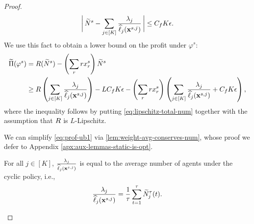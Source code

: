 \documentclass[12pt]{article}
\begin{document}
\begin{proof}
\begin{align}
     \bigg{\lvert}\, \widetilde{N}^s-\sum_{j \in [K]}\frac{\lambda_j}{\widehat{\ell}_j(\mathbf{x}^{s,j})}\, \bigg{\rvert} \leq C_fK\epsilon.
\end{align}
We use this fact to obtain a lower bound on the profit under $\varphi^s$:
\begin{align}\label{eq:prof-ub1}
    \widetilde{\Pi}(\varphi^s) &= R(\widetilde{N}^s) - \left(\sum_r rx_r^s\right)\widetilde{N}^s \\
    &\geq R\left(\sum_{j \in [K]}\frac{\lambda_j}{\widehat{\ell}_j(\mathbf{x}^{s,j})}\right) - LC_fK\epsilon - \left(\sum_r rx_r^s\right)\left(\sum_{j \in [K]}\frac{\lambda_j}{\widehat{\ell}_j(\mathbf{x}^{s,j})} + C_fK\epsilon\right),
\end{align}
where the inequality follows by putting \eqref{eq:lipschitz-total-num} together with the assumption that $R$ is $L$-Lipschitz.

We can simplify \eqref{eq:prof-ub1} via \cref{lem:weight-avg-conserves-num}, whose proof we defer to Appendix \ref{apx:aux-lemmas-static-is-opt}.
\begin{lemma}\label{lem:weight-avg-conserves-num}
For all $j \in [K]$, $\frac{\lambda_j}{\widehat{\ell}_j(\mathbf{x}^{s,j})}$ is equal to the average number of agents under the cyclic policy, i.e.,
$$\frac{\lambda_j}{\widehat{\ell}_j(\mathbf{x}^{s,j})} = \frac1\tau \sum_{t=1}^\tau \widetilde{N}^\tau_j(t).$$
\end{lemma}


\end{proof}
\end{document}

